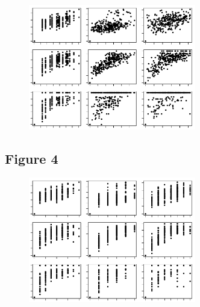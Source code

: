 \documentclass[12pt]{article}
\begin{document}
\begin{figure}[ht!]
	\centering\includegraphics[width=0.65\textwidth]{BetaGeoDist.pdf}
\end{figure}

\newpage

\subsection*{Figure 4}

\begin{figure}[ht!]
	\centering\includegraphics[width=0.65\textwidth]{BetaTopoDist.pdf}
\end{figure}

\newpage
\end{document}

